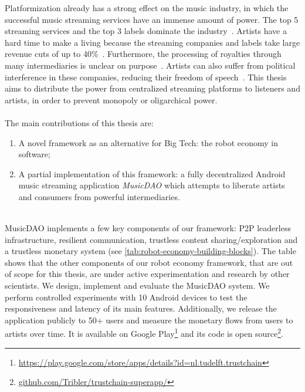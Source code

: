 Platformization already has a strong effect on the music industry, in which the successful music streaming services have an immense amount of power. The top 5 streaming services and the top 3 labels dominate the industry~\citep{midiamarketshare2020}. Artists have a hard time to make a living because the streaming companies and labels take large revenue cuts of up to 40\%~\citep{chris2018dissecting}. Furthermore, the processing of royalties through many intermediaries is unclear on purpose~\citep{prey2020locating}. Artists can also suffer from political interference in these companies, reducing their freedom of speech~\citep{balkin2017free}. This thesis aims to distribute the power from centralized streaming platforms to listeners and artists, in order to prevent monopoly or oligarchical power.
\\
\\
The main contributions of this thesis are:
\begin{enumerate}
    \item A novel framework as an alternative for Big Tech: the robot economy in software;
    \item A partial implementation of this framework: a fully decentralized Android music streaming application \textit{MusicDAO} which attempts to liberate artists and consumers from powerful intermediaries.
\end{enumerate}
\\
MusicDAO implements a few key components of our framework: P2P leaderless infrastructure, resilient communication, trustless content sharing/exploration and a trustless monetary system (see \ref{tab:robot-economy-building-blocks}). The table shows that the other components of our robot economy framework, that are out of scope for this thesis, are under active experimentation and research by other scientists. We design, implement and evaluate the MusicDAO system. We perform controlled experiments with 10 Android devices to test the responsiveness and latency of its main features. Additionally, we release the application publicly to 50+ users and measure the monetary flows from users to artists over time. It is available on Google Play\footnote{\url{https://play.google.com/store/apps/details?id=nl.tudelft.trustchain}} and its code is open source\footnote{\url{github.com/Tribler/trustchain-superapp/}}.

